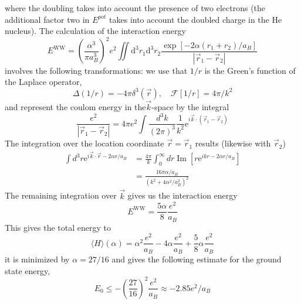 where the doubling takes into account the presence of two electrons (the additional factor two in $E^{pot}$ takes into account the doubled charge in the He nucleus). The calculation of the interaction energy
\begin{equation}
    E^{\mathrm{WW}}=\left(\frac{\alpha^{3}}{\pi a_{B}^{3}}\right)^{2} e^{2} \iint \mathrm{d}^{3} r_{1} \mathrm{d}^{3} r_{2} \frac{\exp \left[-2 \alpha\left(r_{1}+r_{2}\right) / a_{B}\right]}{\left|\vec{r}_{1}-\vec{r}_{2}\right|}
    \end{equation}
involves the following transformations: we use that $1 / r$ is the Green's function of the Laplace operator,
\begin{equation}
    \Delta(1 / r)=-4 \pi \delta^{3}(\vec{r}), \quad \mathcal{F}[1 / r]=4 \pi / k^{2}
    \end{equation}
and represent the coulom energy in the$\vec{k}$-space by the integral
$$
    \frac{e^{2}}{\left|\vec{r}_{1}-\vec{r}_{2}\right|}=4 \pi e^{2} \int \frac{d^{3} k}{(2 \pi)^{3}} \frac{1}{k^{2}} \mathrm{e}^{i \vec{k} \cdot\left(\vec{r}_{1}-\vec{r}_{2}\right)}
$$
The integration over the location coordinate $\vec{r}=\vec{r}_1$ results (likewise with $\vec{r}_2$)
\begin{equation}
\begin{aligned} \int d^{3} r \mathrm{e}^{i \vec{k} \cdot \vec{r}-2 \alpha r / a_{B}} &=\frac{4 \pi}{k} \int_{0}^{\infty} d r \operatorname{Im}\left[r \mathrm{e}^{i k r-2 \alpha r / a_{B}}\right] \\ &=\frac{16 \pi \alpha / a_{B}}{\left(k^{2}+4 \alpha^{2} / a_{B}^{2}\right)^{2}} \end{aligned}
\end{equation}
The remaining integration over $\vec{k}$ gives us the interaction energy
\begin{equation}
    E^{\mathrm{WW}}=\frac{5 \alpha}{8} \frac{e^{2}}{a_{B}}
    \end{equation}
This gives the total energy to
\begin{equation}
    \langle H\rangle(\alpha)=\alpha^{2} \frac{e^{2}}{a_{B}}-4 \alpha \frac{e^{2}}{a_{B}}+\frac{5}{8} \alpha \frac{e^{2}}{a_{B}}
    \end{equation}
it is minimized by $\alpha = 27/16$ and gives the following estimate for the ground state energy,
\begin{equation}
    E_{0} \leq-\left(\frac{27}{16}\right)^{2} \frac{e^{2}}{a_{B}} \approx-2.85 e^{2} / a_{B}
    \end{equation}
